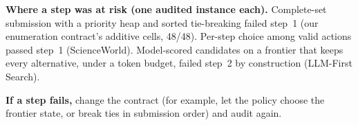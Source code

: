 \begin{protocolbox}[!t]
\begin{tcolorbox}[
  title={Four-step validation},
  colbacktitle=black!60,
  coltitle=white,
  colback=black!3,
  colframe=black!60,
  fonttitle=\bfseries,
  fontupper=\small,
  boxrule=0.5pt,
  boxsep=5pt]
\smallskip
\textbf{Where a step was at risk (one audited instance each).} Complete-set submission with a priority heap and sorted tie-breaking failed step~1 (our enumeration contract's additive cells, 48/48). Per-step choice among valid actions passed step~1 (ScienceWorld). Model-scored candidates on a frontier that keeps every alternative, under a token budget, failed step~2 by construction (LLM-First Search).

\smallskip
\textbf{If a step fails,} change the contract (for example, let the policy choose the frontier state, or break ties in submission order) and audit again.
\end{tcolorbox}
\end{protocolbox}

